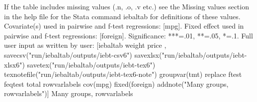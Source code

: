 If the table includes missing values (.n, .o, .v etc.) see the Missing values section in the help file for the Stata command iebaltab for definitions of these values. Covariate(s) used in pairwise and f-test regressions: [mpg]. Fixed effect used in pairwise and f-test regressions: [foreign]. Significance: ***=.01, **=.05, *=.1. Full user input as written by user: [iebaltab weight price , savecsv("run/iebaltab/outputs/iebt-csv6") savexlsx("run/iebaltab/outputs/iebt-xlsx6") savetex("run/iebaltab/outputs/iebt-tex6") texnotefile("run/iebaltab/outputs/iebt-tex6-note") groupvar(tmt) replace ftest feqtest total rowvarlabels cov(mpg) fixed(foreign) addnote("Many groups, rowvarlabels")] Many groups, rowvarlabels
